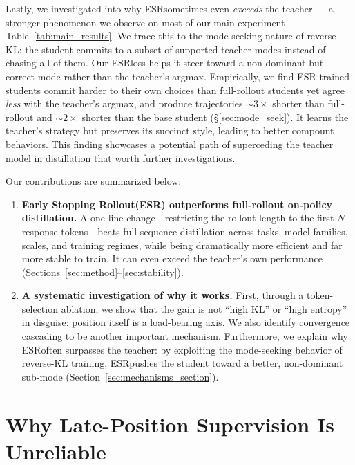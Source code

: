 \documentclass{article}
\newcommand{\method}{ESR}
\newcommand{\methodfull}{Early Stopping Rollout}
\begin{document}
Lastly, we investigated into why \method sometimes even \emph{exceeds} the teacher --- a stronger phenomenon we observe on most of our main experiment Table~\ref{tab:main_results}. We trace this to the mode-seeking nature of reverse-KL: the student commits to a subset of supported teacher modes instead of chasing all of them. Our \method loss helps it steer toward a non-dominant but correct mode rather than the teacher's argmax. Empirically, we find \method-trained students commit harder to their own choices than full-rollout students yet agree \emph{less} with the teacher's argmax, and produce trajectories ${\sim}3\times$ shorter than full-rollout and ${\sim}2\times$ shorter than the base student (\S\ref{sec:mode_seek}). It learns the teacher's strategy but preserves its succinct style, leading to better compount behaviors. This finding showcases a potential path of superceding the teacher model in distillation that worth further investigations.

Our contributions are summarized below:
\begin{enumerate}
    \item \textbf{\methodfull (\method) outperforms full-rollout on-policy distillation.} A one-line change---restricting the rollout length to the first $N$ response tokens---beats full-sequence distillation across tasks, model families, scales, and training regimes, while being dramatically more efficient and far more stable to train. It can even exceed the teacher's own performance (Sections~\ref{sec:method}--\ref{sec:stability}).
    \item \textbf{A systematic investigation of why it works.} First, through a token-selection ablation, we show that the gain is not ``high KL'' or ``high entropy'' in disguise: position itself is a load-bearing axis. We also identify convergence cascading to be another important mechanism. Furthermore, we explain why \method often surpasses the teacher: by exploiting the mode-seeking behavior of reverse-KL training, \method pushes the student toward a better, non-dominant sub-mode (Section~\ref{sec:mechanisms_section}).
\end{enumerate}


\section{Why Late-Position Supervision Is Unreliable}
\label{sec:motivation}
\end{document}
